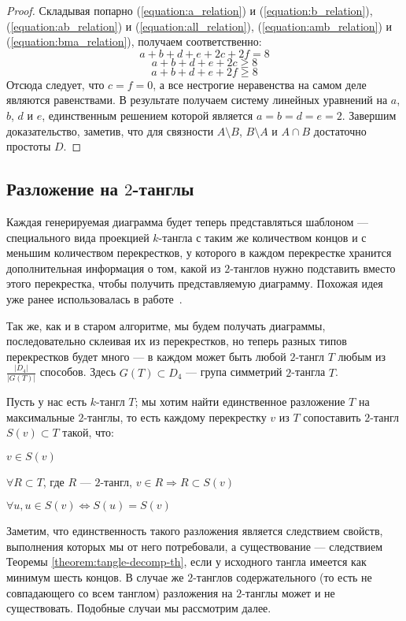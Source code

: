 \begin{proof}
			Складывая попарно (\ref{equation:a_relation}) и (\ref{equation:b_relation}),
			(\ref{equation:ab_relation}) и (\ref{equation:all_relation}),
			(\ref{equation:amb_relation}) и (\ref{equation:bma_relation}), получаем соответственно:
			\[a + b + d + e + 2c + 2f = 8\]
			\[a + b + d + e + 2c \ge 8\]
			\[a + b + d + e + 2f \ge 8\]
			Отсюда следует, что $c = f = 0$, а все нестрогие неравенства на самом деле являются равенствами. В результате
			получаем систему линейных уравнений на $a$, $b$, $d$ и $e$, единственным решением которой является
			$a = b = d = e = 2$. Завершим доказательство, заметив, что для связности $A\setminus B$, $B\setminus A$ и
			$A\cap B$ достаточно простоты $D$.
		\end{proof}


	\subsection{Разложение на $2$-танглы}
		\label{subsection:subtangle-decomposition}

		Каждая генерируемая диаграмма будет теперь представляться шаблоном --- специального вида проекцией $k$-тангла с таким же
		количеством концов и с меньшим количеством перекрестков, у которого в каждом перекрестке хранится дополнительная информация
		о том, какой из $2$-танглов нужно подставить вместо этого перекрестка, чтобы получить представляемую диаграмму. Похожая
		идея уже ранее использовалась в работе~\cite{SundbergThistlethwaite1998}.
		
		Так же, как и в старом алгоритме, мы будем получать диаграммы, последовательно склеивая их из перекрестков, но теперь разных
		типов перекрестков будет много --- в каждом может быть любой $2$-тангл $T$ любым из $\frac{|D_4|}{|G(T)|}$ способов. Здесь
		$G(T) \subset D_4$ --- група симметрий $2$-тангла $T$.

		Пусть у нас есть $k$-тангл $T$; мы хотим найти единственное разложение $T$ на максимальные $2$-танглы, то есть
		каждому перекрестку $v$ из $T$ сопоставить $2$-тангл $S(v) \subset T$ такой, что:
		\begin{list}{}{}
			\item $v \in S(v)$
			\item $\forall R \subset T$, где $R$ --- $2$-тангл, $v \in R \Rightarrow R \subset S(v)$
			\item $\forall u, u \in S(v) \Leftrightarrow S(u) = S(v)$
		\end{list}
		Заметим, что единственность такого разложения является следствием свойств, выполнения которых мы от него потребовали, а
		существование --- следствием Теоремы \ref{theorem:tangle-decomp-th}, если у исходного тангла имеется как минимум шесть
		концов. В случае же $2$-танглов содержательного (то есть не совпадающего со всем танглом) разложения на $2$-танглы
		может и не существовать. Подобные случаи мы рассмотрим далее.

